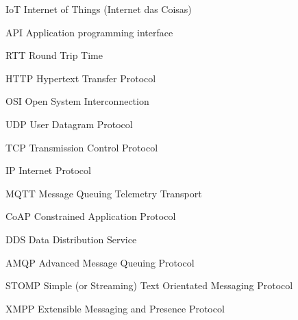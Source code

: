 \begin{siglas}
	\item[IoT] Internet of Things (Internet das Coisas)
	\item[API] Application programming interface
	\item [RTT] Round Trip Time
	\item[HTTP] Hypertext Transfer Protocol	
	\item[OSI] Open System Interconnection
	\item[UDP] User Datagram Protocol	
	\item[TCP] Transmission Control Protocol
	\item[IP] Internet Protocol
	\item[MQTT] Message Queuing Telemetry Transport
	\item [CoAP] Constrained Application Protocol
	\item [DDS] Data Distribution Service
	\item [AMQP] Advanced Message Queuing Protocol
	\item [STOMP] Simple (or Streaming) Text Orientated Messaging Protocol
	\item [XMPP] Extensible Messaging and Presence Protocol
\end{siglas}
